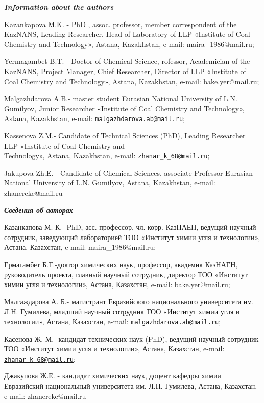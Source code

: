 \begin{authorinfo}
\emph{{\bfseries Information about the authors}}

Kazankapova M.K. - PhD , assoc. professor, member correspondent of the
KazNANS, Leading Researcher, Head of Laboratory of LLP «Institute of
Coal Chemistry and Technology», Astana, Kazakhstan, e-mail:
maira\_1986@mail.ru;

Yermagambet B.T. - Doctor of Chemical Science, rofessor, Academician of
the KazNANS, Project Manager, Chief Researcher, Director of LLP
«Institute of Coal Chemistry and Technology», Astana, Kazakhstan,
e-mail: bake.yer@mail.ru;

Malgazhdarova A.B.- master student Eurasian National University of L.N.
Gumilyov, Junior Researcher «Institute of Coal Chemistry and
Technology», Astana, Kazakhstan, e-mail:
\href{mailto:malgazhdarova.ab@mail.ru}{\nolinkurl{malgazhdarova.ab@mail.ru}};

Kassenova Z.M.- Сandidate of Technical Sciences (PhD), Leading
Researcher LLP «Institute of Coal Chemistry and \\Technology», Astana,
Kazakhstan, e-mail:
\href{mailto:zhanar_k_68@mail.ru}{\nolinkurl{zhanar\_k\_68@mail.ru}};

Jakupova Zh.E. - Candidate of Chemical Sciences, associate Professor
Eurasian National University of L.N. Gumilyov, Astana, Kazakhstan,
e-mail: zhanereke@mail.ru

\emph{{\bfseries Сведения об авторах}}

Казанкапова М. К. -PhD, асс. профессор, чл.-корр. КазНАЕН, ведущий
научный сотрудник, заведующий лабораторией ТОО «Институт химии угля и
технологии», Астана, Казахстан, e-mail: maira\_1986@mail.ru;

Ермагамбет Б.Т.-доктор химических наук, профессор, академик КазНАЕН,
руководитель проекта, главный научный сотрудник, директор ТОО «Институт
химии угля и технологии», Астана, Казахстан, e-mail: bake.yer@mail.ru;

Малгаждарова А. Б.- магистрант Евразийского национального университета
им. Л.Н. Гумилева, младший научный сотрудник ТОО «Институт химии угля и
технологии», Астана, Казахстан, e-mail:
\href{mailto:malgazhdarova.ab@mail.ru}{\nolinkurl{malgazhdarova.ab@mail.ru}};

Касенова Ж. М.- кандидат технических наук (PhD), ведущий научный
сотрудник ТОО «Институт химии угля и технологии», Астана, Казахстан,
e-mail:
\href{mailto:zhanar_k_68@mail.ru}{\nolinkurl{zhanar\_k\_68@mail.ru}};

Джакупова Ж.Е. - кандидат химических наук, доцент кафедры химии
Евразийский национальный университета им. Л.Н. Гумилева, Астана,
Казахстан, e-mail: zhanereke@mail.ru
\end{authorinfo}
